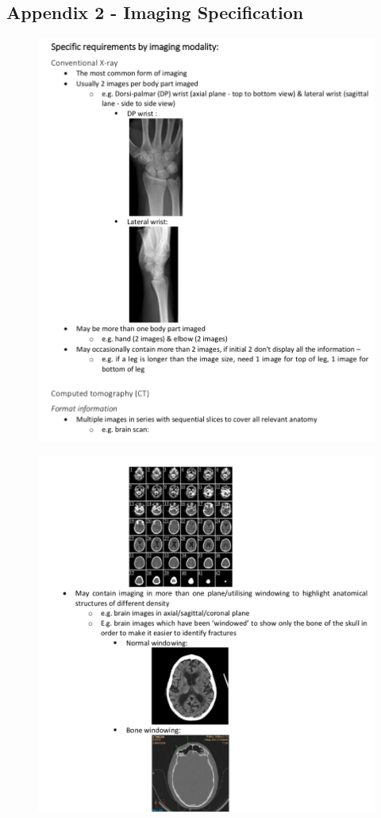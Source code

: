 \documentclass[12pt,twoside]{article}
\begin{document}
\clearpage

\subsection {Appendix 2 - Imaging Specification}

\begin{figure}[ht]
\centering
\includegraphics[width = 0.95\hsize]{./figures/ImagingSpec1}
\end{figure}
\clearpage

\begin{figure}[ht]
\centering
\includegraphics[width = 0.95\hsize]{./figures/ImagingSpec2}
\end{figure}
\clearpage
\end{document}
